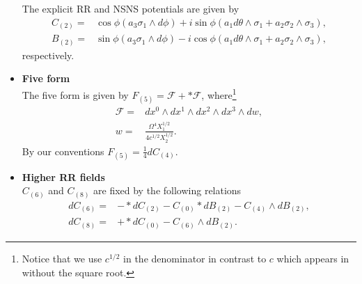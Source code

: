 \documentclass[11pt]{article}
\begin{document}
\begin{itemize}
The explicit RR and NSNS potentials are given by
\begin{align}
C_{(2)} = & \cos\phi (a_3 \sigma_1 \wedge d\phi) + i \sin\phi \left(a_1 d\theta \wedge \sigma_1 + a_2 \sigma_2 \wedge \sigma_3\right),\nonumber\\
B_{(2)} = & \sin\phi (a_3 \sigma_1 \wedge d\phi) - i\cos\phi \left(a_1 d\theta \wedge \sigma_1 + a_2 \sigma_2 \wedge \sigma_3\right),
\end{align}
respectively.


  \item \textbf{Five form}\\
  The five form is given by $F_{(5)} = \mathcal{F} + \ast \mathcal{F}$, where\footnote{Notice that we use $c^{1/2}$ in the denominator in contrast to $c$ which appears in \cite{Pilch:2003jg} without the square root.}
\begin{align}
\mathcal{F} = & dx^0 \wedge dx^1 \wedge dx^2 \wedge dx^3 \wedge dw,\nonumber\\
w = & \frac{\Omega^4 X_1^{1/2}}{4 c ^{1/2} X_2^{1/2}    }.
\end{align}
By our conventions $F_{(5)} = \frac{1}{4}d C_{(4)}$.

  \item \textbf{Higher RR fields}\\
$C_{(6)}$ and $C_{(8)}$ are fixed by the following relations
\begin{align}
d C_{(6)} = & -\ast d C_{(2)} - C_{(0)} \ast d B_{(2)} - C_{(4)} \wedge  d B_{(2)},\nonumber\\
d C_{(8)} = & +\ast d C_{(0)} - C_{(6)} \wedge  d B_{(2)}.
\end{align}


\end{itemize}
\end{document}
